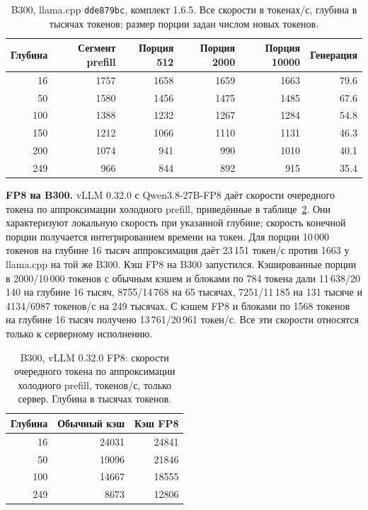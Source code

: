 \begin{table}[t]
\centering
\caption{B300, llama.cpp \texttt{dde879bc}, комплект 1.6.5. Все скорости в токенах/с,
глубина в тысячах токенов; размер порции задан числом новых токенов.}
\label{tab:b300-llama}
\footnotesize
\begin{tabular}{rrrrrr}
\toprule
Глубина & Сегмент prefill & Порция 512 & Порция 2000 & Порция 10000 & Генерация \\
\midrule
16 & 1757 & 1658 & 1659 & 1663 & 79.6 \\
50 & 1580 & 1456 & 1475 & 1485 & 67.6 \\
100 & 1388 & 1232 & 1267 & 1284 & 54.8 \\
150 & 1212 & 1066 & 1110 & 1131 & 46.3 \\
200 & 1074 & 941 & 990 & 1010 & 40.1 \\
249 & 966 & 844 & 892 & 915 & 35.4 \\
\bottomrule
\end{tabular}
\end{table}

\textbf{FP8 на B300.} vLLM 0.32.0 с Qwen3.8-27B-FP8 даёт скорости очередного токена по аппроксимации
холодного prefill, приведённые в таблице~\ref{tab:b300-vllm}. Они характеризуют локальную скорость
при указанной глубине; скорость конечной порции получается интегрированием времени на токен.
Для порции 10\,000 токенов на глубине 16 тысяч аппроксимация даёт 23\,151 токен/с
против 1663 у llama.cpp на той же B300. Кэш FP8 на B300 запустился.
Кэшированные порции в 2000/10\,000 токенов с обычным кэшем и блоками по 784 токена дали
11\,638/20\,140 на глубине 16 тысяч, 8755/14\,768 на 65 тысячах, 7251/11\,185 на 131 тысяче
и 4134/6987 токенов/с на 249 тысячах. С кэшем FP8 и блоками по 1568 токенов на глубине
16 тысяч получено 13\,761/20\,961 токен/с. Все эти скорости относятся только к серверному исполнению.

\begin{table}[t]
\centering
\caption{B300, vLLM 0.32.0 FP8: скорости очередного токена по аппроксимации холодного prefill,
токенов/с, только сервер. Глубина в тысячах токенов.}
\label{tab:b300-vllm}
\footnotesize
\begin{tabular}{rrr}
\toprule
Глубина & Обычный кэш & Кэш FP8 \\
\midrule
16 & 24031 & 24841 \\
50 & 19096 & 21846 \\
100 & 14667 & 18555 \\
249 & 8673 & 12806 \\
\bottomrule
\end{tabular}
\end{table}

